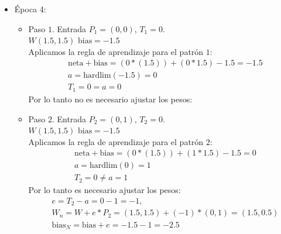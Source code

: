 \documentclass{article}
\begin{document}
{{\begin{itemize}
\begin{itemize}
\item Paso $4$. Entrada $P_4 = (1, 1)$, $T_4 = 1$. \\
$W(0.5, 0.5)$  $\text{bias} = -2.5$ \\

Aplicamos la regla de aprendizaje para el patrón $4$:
\begin{align*}
&\text{neta} + \text{bias}= (1 * (0.5)) + (1 * 0.5) - 2.5 = -1.5\\
&a = \text{hardlim}(-1.5) = 0 \\
&T_4 = 1 \neq a = 0
\end{align*}
Por lo tanto es necesario ajustar los pesos:
\begin{align*}
&e = T_4 - a = 1- 0 =  1, \\
&W_n = W + e* P_4 = (0.5, 0.5) + (1) * (1,1) = (1.5, 1.5) \\
&\text{bias}_N = \text{bias} + e = -2.5 + 1 = -1.5
\end{align*}
\end{itemize}

\item Época 4:
\begin{itemize}
\item Paso $1$. Entrada $P_1 = (0, 0)$, $T_1 = 0$. \\
$W(1.5, 1.5)$  $\text{bias} = -1.5$ \\

Aplicamos la regla de aprendizaje para el patrón $1$:
\begin{align*}
&\text{neta} + \text{bias}= (0 * (1.5)) + (0 * 1.5) - 1.5 = -1.5\\
&a = \text{hardlim}(-1.5) = 0 \\
&T_1 = 0 =  a = 0
\end{align*}
Por lo tanto no es necesario ajustar los pesos:

\item Paso $2$. Entrada $P_2 = (0, 1)$, $T_2 = 0$. \\
$W(1.5, 1.5)$  $\text{bias} = -1.5$ \\

Aplicamos la regla de aprendizaje para el patrón $2$:
\begin{align*}
&\text{neta} + \text{bias}= (0 * (1.5)) + (1 * 1.5) - 1.5 = 0\\
&a = \text{hardlim}(0) = 1 \\
&T_2 = 0 \neq a = 1
\end{align*}
Por lo tanto es necesario ajustar los pesos:
\begin{align*}
&e = T_2 - a = 0- 1 =  -1, \\
&W_n = W + e* P_2 = (1.5, 1.5) + (-1) * (0,1) = (1.5, 0.5) \\
&\text{bias}_N = \text{bias} + e = -1.5 - 1 = -2.5
\end{align*}


\end{itemize}
\end{itemize}}}
\end{document}
